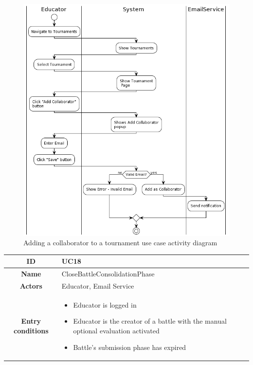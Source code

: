 \begin{center}
\begin{tabular}{ |c|m{10cm}| }
        \hline
    \end{tabular}
    \begin{figure}[H]
        \hspace{50px}
        \includegraphics[scale=0.5]{Diagrams/activity_addcollaborator.png}
        \caption{Adding a collaborator to a tournament use case activity diagram}
    \end{figure}
    \begin{tabular}{ |c|m{10cm}| }
        \hline
        \textbf{ID} & UC18 \\
        \hline
        \textbf{Name} & CloseBattleConsolidationPhase \\
        \hline
        \textbf{Actors} & Educator, Email Service \\
        \hline
        \textbf{Entry conditions} &
        \begin{itemize}
            \item Educator is logged in
            \item Educator is the creator of a battle with the manual optional evaluation activated
            \item Battle's submission phase has expired
        \end{itemize} \\

\end{tabular}
\end{center}
